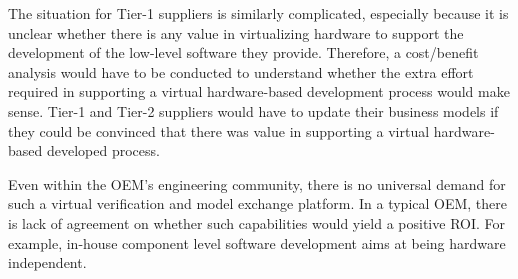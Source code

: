 The situation for Tier-1 suppliers is similarly complicated, especially because it is unclear whether there is any value in virtualizing hardware to support the development of the low-level software they provide. Therefore, a cost/benefit analysis would have to be conducted to understand whether the extra effort required in supporting a virtual hardware-based development process would make sense. 
Tier-1 and Tier-2 suppliers would have to update their business models if they could be convinced that there was value in supporting a virtual hardware-based developed process.


Even within the OEM’s engineering community, there is no universal demand
for such a virtual verification and model exchange platform.
In a typical OEM, there is lack of agreement on whether such capabilities would yield a positive ROI.
For example, in-house component level software development aims at being hardware independent.





